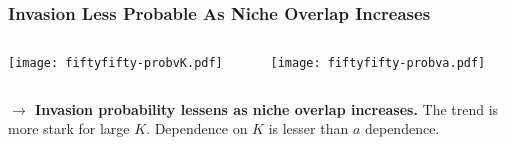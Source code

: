 \documentclass[dvipsnames]{beamer}
\begin{document}
\begin{frame}
\frametitle{Invasion Less Probable As Niche Overlap Increases}
\begin{columns}
	\begin{column}{5.5cm}
		\begin{center}
			\texttt{[image: fiftyfifty-probvK.pdf]}
		\end{center}
	\end{column}
	\begin{column}{5.5cm}
		\begin{center}
			\texttt{[image: fiftyfifty-probva.pdf]}
		\end{center}
	\end{column}
\end{columns}
\vspace{0.2cm}
\justifying
	\textbf{$\rightarrow$ Invasion probability lessens as niche overlap increases.} The trend is more stark for large $K$. %
	Dependence on $K$ is lesser than $a$ dependence. 
\end{frame}
\end{document}
